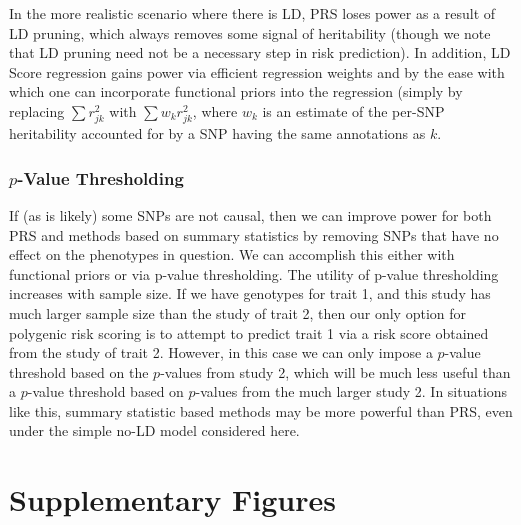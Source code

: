 \documentclass[11pt]{article}
\numberwithin{equation}{section}
\numberwithin{definition}{section}
\numberwithin{thm}{section}
\numberwithin{lemma}{section}
\numberwithin{prop}{section}
\numberwithin{cor}{section}
\numberwithin{hyp}{section}
\begin{document}
In the more realistic scenario where there is LD, PRS loses power as a result of LD pruning, which always removes some 
signal of heritability (though we note that LD pruning need not be a necessary step in risk prediction). In addition, LD
Score regression gains power via efficient regression weights and by the ease with which one can incorporate functional priors
into the regression (simply by replacing $\sum r^2_{jk}$ with $\sum w_kr^2_{jk}$, where $w_k$ is an estimate of the 
per-SNP heritability accounted for by a SNP having the same annotations as $k$.


\subsubsection{$p$-Value Thresholding}

If (as is likely) some SNPs are not causal, then we can improve power for both PRS and methods based on summary statistics
by removing SNPs that have no effect on the phenotypes in question. We can accomplish this either with functional priors or 
via p-value thresholding. The utility of p-value thresholding increases with sample size. If we have genotypes for trait 1, 
and this study has much larger sample size than the study of trait 2, then our only option for polygenic risk scoring is to attempt
to predict trait 1 via a risk score obtained from the study of trait 2. However, in this case we can only impose a $p$-value threshold
based on the $p$-values from study 2, which will be much less useful than a $p$-value threshold based on $p$-values from
the much larger study 2.
In situations like this, summary statistic based methods may be more
powerful than PRS, even under the simple no-LD model considered here.



\newpage
\section{Supplementary Figures}
\end{document}
